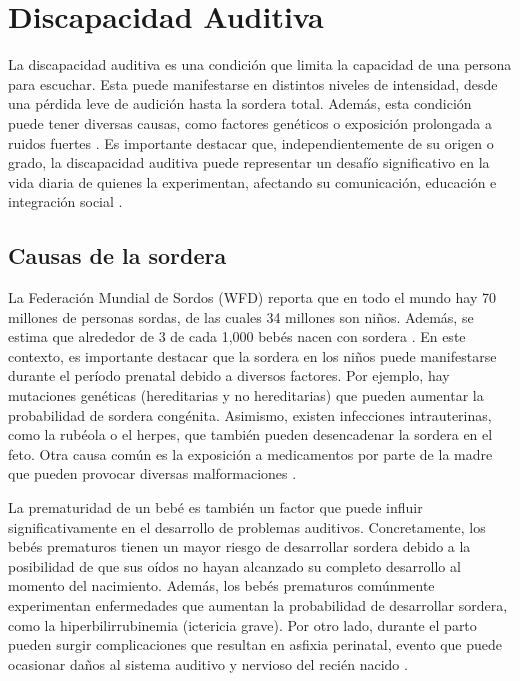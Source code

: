 \section{Discapacidad Auditiva}

La discapacidad auditiva es una condición que limita la capacidad de una persona para escuchar. Esta puede manifestarse en distintos niveles de intensidad, desde una pérdida leve de audición hasta la sordera total. Además, esta condición puede tener diversas causas, como factores genéticos o exposición prolongada a ruidos fuertes \cite{five}. Es importante destacar que, independientemente de su origen o grado, la discapacidad auditiva puede representar un desafío significativo en la vida diaria de quienes la experimentan, afectando su comunicación, educación e integración social \cite{six}. 


\subsection{Causas de la sordera}

La Federación Mundial de Sordos (WFD) reporta que en todo el mundo hay 70 millones de personas sordas, de las cuales 34 millones son niños. Además, se estima que alrededor de 3 de cada 1,000 bebés nacen con sordera \cite{six}. En este contexto, es importante destacar que la sordera en los niños puede manifestarse durante el período prenatal debido a diversos factores. Por ejemplo, hay mutaciones genéticas (hereditarias y no hereditarias) que pueden aumentar la probabilidad de sordera congénita. Asimismo, existen infecciones intrauterinas, como la rubéola o el herpes, que también pueden desencadenar la sordera en el feto. Otra causa común es la exposición a medicamentos por parte de la madre que pueden provocar diversas malformaciones \cite{seven}. 

La prematuridad de un bebé es también un factor que puede influir significativamente en el desarrollo de problemas auditivos. Concretamente, los bebés prematuros tienen un mayor riesgo de desarrollar sordera debido a la posibilidad de que sus oídos no hayan alcanzado su completo desarrollo al momento del nacimiento. Además, los bebés prematuros comúnmente experimentan enfermedades que aumentan la probabilidad de desarrollar sordera, como la hiperbilirrubinemia (ictericia grave). Por otro lado, durante el parto pueden surgir complicaciones que resultan en asfixia perinatal, evento que puede ocasionar daños al sistema auditivo y nervioso del recién nacido \cite{seven}.

